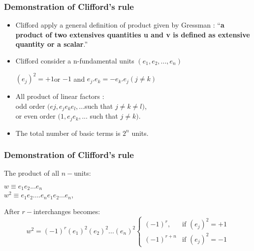 \label{columns}
\begin{frame}\frametitle{Demonstration of Clifford’s rule }

\begin{itemize}
	\item 
Clifford apply a general definition of product given by Gressman : “\textbf{a product of two extensives quantities u and v is defined as extensive quantity or a scalar}.”


	\item 

Clifford consider a n-fundamental units $(e_1,e_2,...,e_n)$ \\

\begin{center}
	$(e_j)^2=+1$or $-1$  and $e_j.e_k=-e_k.e_j (j \neq k)$ 
\end{center}
	\item 
All product of linear factors : \\odd order $(ej, e_j e_k e_l, ... $such that $j \neq k \neq l)$,
\\or  even order $( 1, e_j e_k, ...$ such that $j \neq k)$. \\


	\item 
The total number of basic terms is $2^n$ units.


\end{itemize}

\end{frame}


\begin{frame}\frametitle{Demonstration of Clifford’s rule }

The product of all $n-$units:\\
\begin{center}
	$w \equiv e_1 e_2...e_n$ \\
$w^2 \equiv e_1 e_2....e_n e_1 e_2...e_n$,\\

\end{center}
After $r-$interchanges becomes:
\[
w^2 =  (-1)^r (e_{1})^2 (e_{2})^2 ...(e_{n})^2 
\begin{cases}
(-1)^r,& \text{if } (e_j)^2 = + 1\\
(-1)^{r+n} &  \text{if } (e_j)^2 = - 1
\end{cases}


\]

\end{frame}



